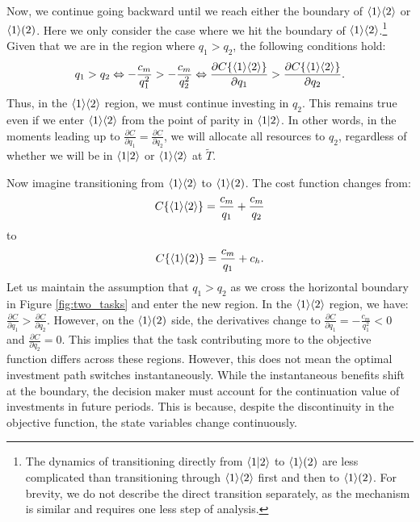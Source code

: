 \documentclass{article}
\theoremstyle{plain}
\theoremstyle{plain}
\begin{document}
Now, we continue going backward until we reach either the boundary of $\langle 1 \rangle\langle 2 \rangle$ or $\langle 1 \rangle( 2 )$.
Here we only consider the case where we hit the boundary of $\langle 1 \rangle\langle 2 \rangle$.\footnote{The dynamics of transitioning directly from $\langle 1|2 \rangle$ to $\langle 1 \rangle( 2 )$ are less
complicated than transitioning through $\langle 1 \rangle\langle 2 \rangle$ first and then to $\langle 1 \rangle( 2 )$. 
For brevity, we do not describe the direct transition separately, as the mechanism is similar and requires one less step of analysis.} 
Given that we are in the region where $q_{1}>q_{2}$, the following conditions hold:
\[
q_{1}>q_{2}\Leftrightarrow-\frac{c_{m}}{q_{1}^{2}}>-\frac{c_{m}}{q_{2}^{2}}\Leftrightarrow\frac{\partial C\{\langle 1 \rangle\langle 2 \rangle\}}{\partial q_{1}}>\frac{\partial C\{\langle 1 \rangle\langle 2 \rangle\}}{\partial q_{2}}.
\]
Thus, in the $\langle 1 \rangle\langle 2 \rangle$ region, we must continue investing in $q_{2}$.
This remains true even if we enter $\langle 1 \rangle\langle 2 \rangle$ from the point of parity in $\langle 1|2 \rangle$. 
In other words, in the moments leading up to $\frac{\partial C}{\partial q_{1}}=\frac{\partial C}{\partial q_{2}}$, we will allocate all resources to $q_{2}$, regardless of whether
we will be in $\langle 1|2 \rangle$ or $\langle 1 \rangle\langle 2 \rangle$ at $\tilde{T}$.

Now imagine transitioning from $\langle 1 \rangle\langle 2 \rangle$ to $\langle 1 \rangle( 2 )$. 
The cost function changes from:
\[
C\{\langle 1 \rangle\langle 2 \rangle\}=\frac{c_{m}}{q_{1}}+\frac{c_{m}}{q_{2}}
\]
to 
\[
C\{\langle 1 \rangle( 2 )\}=\frac{c_{m}}{q_{1}}+c_{h}.
\]
Let us maintain the assumption that $q_{1}>q_{2}$ as we cross the horizontal boundary in Figure \ref{fig:two_tasks} and enter the new region.  
In the $\langle 1 \rangle\langle 2 \rangle$ region, we have: $\frac{\partial C}{\partial q_{1}}>\frac{\partial C}{\partial q_{2}}$.
However, on the $\langle 1 \rangle( 2 )$ side, the derivatives change to $\frac{\partial C}{\partial q_{1}}=-\frac{c_{m}}{q_{1}^{2}}<0$ and $\frac{\partial C}{\partial q_{2}}=0$. 
This implies that the task contributing more to the objective function differs across these regions.
However, this does not mean the optimal investment path switches instantaneously. 
While the instantaneous benefits shift at the boundary, the decision maker must account for the continuation value of investments in future periods. 
This is because, despite the discontinuity in the objective function, the state variables change continuously. %
\end{document}
